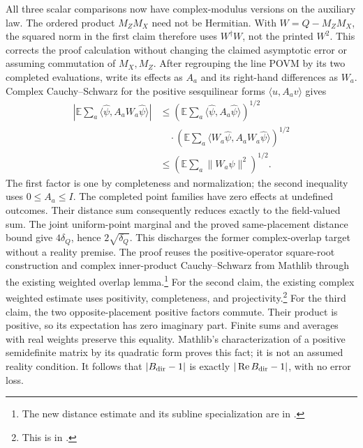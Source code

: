 \documentclass[11pt]{article}
\begin{document}
All three scalar comparisons now have complex-modulus versions on the auxiliary
law. The ordered product $M_ZM_X$ need not be Hermitian. With $W=Q-M_ZM_X$,
the squared norm in the first claim therefore uses $W^\dagger W$, not the
printed $W^2$. This corrects the proof calculation without changing the claimed
asymptotic error or assuming commutation of $M_X,M_Z$.
After regrouping the line POVM by its two completed evaluations, write its
effects as $A_a$ and its right-hand differences as $W_a$. Complex
Cauchy--Schwarz for the positive sesquilinear forms
$\langle u,A_av\rangle$ gives
\begin{align*}
 \left|\mathbb E\sum_a\langle\widehat\psi,A_aW_a\widehat\psi\rangle\right|
 &\leq
 \left(\mathbb E\sum_a\langle\widehat\psi,A_a\widehat\psi\rangle\right)^{1/2}\\
 &\quad\cdot\left(\mathbb E\sum_a
   \langle W_a\widehat\psi,A_aW_a\widehat\psi\rangle\right)^{1/2}\\
 &\leq \left(\mathbb E\sum_a\|W_a\widehat\psi\|^2\right)^{1/2}.
\end{align*}
The first factor is one by completeness and normalization; the second inequality
uses $0\leq A_a\leq I$. The completed point families have zero effects at
undefined outcomes. Their distance sum consequently reduces exactly to the
field-valued sum. The joint uniform-point marginal and the proved same-placement
distance bound give $4\delta_Q$, hence $2\sqrt{\delta_Q}$.
This discharges the former complex-overlap target without a reality premise.
The proof reuses the positive-operator square-root construction and complex
inner-product Cauchy--Schwarz from Mathlib through the existing weighted
overlap lemma.\footnote{The new distance estimate and its subline specialization
are in .}
For the second claim, the existing complex weighted estimate uses positivity,
completeness, and projectivity.\footnote{This is
 in
.}
For the third claim, the two opposite-placement positive factors commute.
Their product is positive, so its expectation has zero imaginary part.
Finite sums and averages with real weights preserve this equality. Mathlib's
characterization of a positive semidefinite matrix by its quadratic form
proves this fact; it is not an assumed reality condition. It follows that
$|B_{\rm dir}-1|$ is exactly $|\operatorname{Re}B_{\rm dir}-1|$,
with no error loss.
\end{document}
